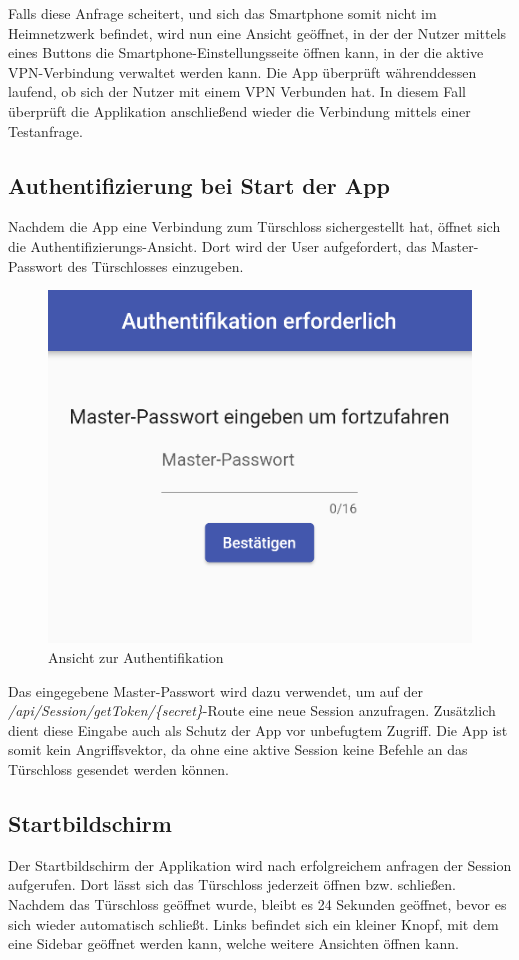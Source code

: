 Falls diese Anfrage scheitert, und sich das Smartphone somit nicht im Heimnetzwerk befindet, 
wird nun eine Ansicht geöffnet, in der der Nutzer mittels eines Buttons
die Smartphone-Einstellungsseite öffnen kann, in der die aktive VPN-Verbindung verwaltet werden kann.
Die App überprüft währenddessen laufend, ob sich der Nutzer mit einem VPN Verbunden hat.
In diesem Fall überprüft die Applikation anschließend wieder die Verbindung mittels einer Testanfrage. 

\subsection{Authentifizierung bei Start der App}
Nachdem die App eine Verbindung zum Türschloss sichergestellt hat, öffnet sich die Authentifizierungs-Ansicht.
Dort wird der User aufgefordert, das Master-Passwort des Türschlosses einzugeben.

\begin{figure}[H]
    \begin{center}
        \includegraphics[width=.6\textwidth]{images/mobile/AuthScreen.png}
        \caption{Ansicht zur Authentifikation}
    \end{center}
\end{figure}

Das eingegebene Master-Passwort wird dazu verwendet, um auf der \textit{/api/Session/getToken/\{secret\}}-Route
eine neue Session anzufragen. Zusätzlich dient diese Eingabe auch als Schutz der App vor unbefugtem Zugriff.
Die App ist somit kein Angriffsvektor, da ohne eine aktive Session keine Befehle an das Türschloss gesendet werden können.

\subsection{Startbildschirm}
Der Startbildschirm der Applikation wird nach erfolgreichem anfragen der Session aufgerufen.
Dort lässt sich das Türschloss jederzeit öffnen bzw. schließen.
Nachdem das Türschloss geöffnet wurde, bleibt es 24 Sekunden geöffnet, bevor es sich wieder automatisch schließt.
Links befindet sich ein kleiner Knopf, mit dem eine Sidebar geöffnet werden kann, welche weitere Ansichten öffnen kann.

